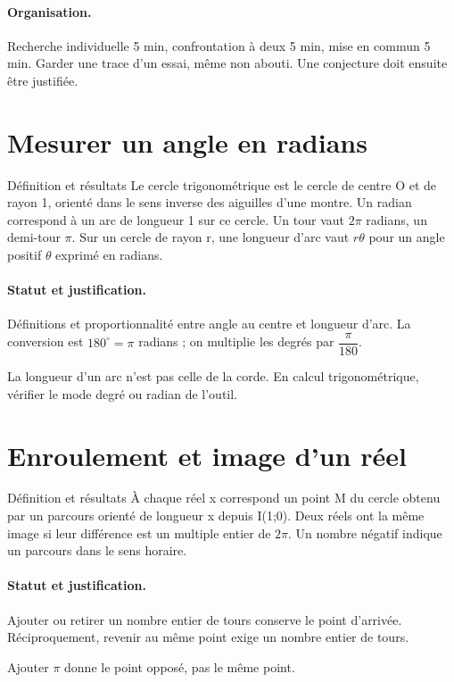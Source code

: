 \paragraph{Organisation.} Recherche individuelle 5 min, confrontation à deux 5 min, mise en commun 5 min. Garder une trace d’un essai, même non abouti. Une conjecture doit ensuite être justifiée.
\section{Mesurer un angle en radians}\label{C10-U1}
\begin{repere}{Définition et résultats}
Le cercle trigonométrique est le cercle de centre O et de rayon 1, orienté dans le sens inverse des aiguilles d’une montre. Un radian correspond à un arc de longueur 1 sur ce cercle. Un tour vaut $2\pi$ radians, un demi-tour $\pi$. Sur un cercle de rayon r, une longueur d’arc vaut $r\theta$ pour un angle positif $\theta$ exprimé en radians.
\end{repere}
\paragraph{Statut et justification.} Définitions et proportionnalité entre angle au centre et longueur d’arc. La conversion est $180^\circ=\pi$ radians ; on multiplie les degrés par $\dfrac{\pi}{180}$.
\label{C10-EX1}
\begin{erreur}La longueur d’un arc n’est pas celle de la corde. En calcul trigonométrique, vérifier le mode degré ou radian de l’outil.\end{erreur}
\label{C10-AP1}
\section{Enroulement et image d’un réel}\label{C10-U2}
\begin{repere}{Définition et résultats}
À chaque réel x correspond un point M du cercle obtenu par un parcours orienté de longueur x depuis I(1;0). Deux réels ont la même image si leur différence est un multiple entier de $2\pi$. Un nombre négatif indique un parcours dans le sens horaire.
\end{repere}
\paragraph{Statut et justification.} Ajouter ou retirer un nombre entier de tours conserve le point d’arrivée. Réciproquement, revenir au même point exige un nombre entier de tours.
\label{C10-EX2}
\begin{erreur}Ajouter $\pi$ donne le point opposé, pas le même point.\end{erreur}
\label{C10-AP2}

